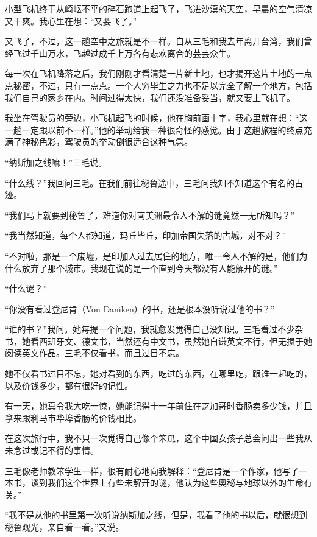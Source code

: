 
\par 小型飞机终于从崎岖不平的碎石跑道上起飞了，飞进沙漠的天空，早晨的空气清凉又干爽。我心里在想：“又要飞了。”
\par 又飞了，不过，这一趟空中之旅就是不一样。自从三毛和我去年离开台湾，我们曾经飞过千山万水，飞越过成千上万各有悲欢离合的芸芸众生。
\par 每一次在飞机降落之后，我们刚刚才看清楚一片新土地，也才揭开这片土地的一点点秘密，不过，只有一点点。一个人穷毕生之力也不足以完全了解一个地方，包括我们自己的家乡在内。时间过得太快，我们还没准备妥当，就又要上飞机了。
\par 我坐在驾驶员的旁边，小飞机起飞的时候，他在胸前画十字，我心里就在想：“这一趟一定跟以前不一样。”他的举动给我一种很奇怪的感觉。由于这趟旅程的终点充满了神秘色彩，驾驶员的举动倒很适合这种气氛。
\par “纳斯加之线嘛！”三毛说。
\par “什么线？”我回问三毛。在我们前往秘鲁途中，三毛问我知不知道这个有名的古迹。
\par “我们马上就要到秘鲁了，难道你对南美洲最令人不解的谜竟然一无所知吗？”
\par “我当然知道，每个人都知道，玛丘毕丘，印加帝国失落的古城，对不对？”
\par “不对啦，那是一个废墟，是印加人过去居住的地方，唯一令人不解的是，他们为什么放弃了那个城市。我现在说的是一个直到今天都没有人能解开的谜。”
\par “什么谜？”
\par “你没有看过登尼肯（Von Daniken）的书，还是根本没听说过他的书？”
\par “谁的书？”我问。她每提一个问题，我就愈发觉得自己没知识。三毛看过不少杂书，她看西班牙文、德文书，当然还有中文书，虽然她自谦英文不行，但无损于她阅读英文作品。三毛不仅看书，而且过目不忘。
\par 她不仅看书过目不忘，她对看到的东西，吃过的东西，在哪里吃，跟谁一起吃的，以及价钱多少，都有很好的记性。
\par 有一天，她真令我大吃一惊，她能记得十一年前住在芝加哥时香肠卖多少钱，并且拿来跟利马市华埠香肠的价钱相比。
\par 在这次旅行中，我不只一次觉得自己像个笨瓜，这个中国女孩子总会问出一些我从未念过或记不得的事情。
\par 三毛像老师教笨学生一样，很有耐心地向我解释：“登尼肯是一个作家，他写了一本书，谈到我们这个世界上有些未解开的谜，他认为这些奥秘与地球以外的生命有关。”
\par “我不是从他的书里第一次听说纳斯加之线，但是，我看了他的书以后，就很想到秘鲁观光，亲自看一看。”又说。
